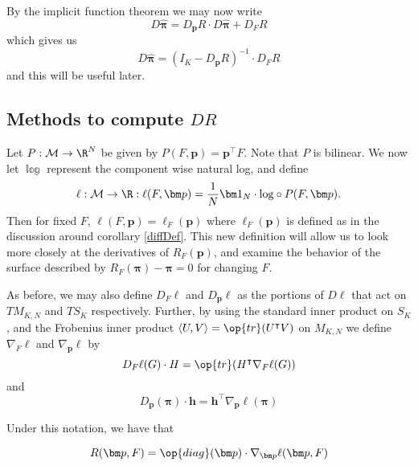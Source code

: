 By the implicit function theorem we may now write
\[D\hat{\bm\pi}=D_{\bm p}R\cdot D\hat{\bm\pi}+D_FR\]
which gives us
\begin{equation}\label{dPiDF}
D\hat{\bm\pi}=\left(I_K-D_{\bm p}R\right)^{-1}\cdot D_{F}R
\end{equation}
and this will be useful later.

\subsection{Methods to compute $DR$}

Let $P:\mathcal{M}\rightarrow \R^{N}$ be given by $P(F,\bm p)=\bm p^{\intercal}F$.  Note that $P$ is bilinear.  We now let $\mathbb{\log}$ represent the component wise natural log, and define 
\[\ell:\mathcal{M}\rightarrow \R:\ell(F,\bm p)=\frac{1}{N}\bm 1_N\cdot\mathbb{\log}\circ P(F,\bm p).\]
Then for fixed $F$, $\ell(F,\bm p)=\ell_F(\bm p)$ where $\ell_F(\bm p)$ is defined as in the discussion around corollary \ref{diffDef}.  This new definition will allow us to look more closely at the derivatives of $R_F(\bm p)$, and examine the behavior of the surface described by $R_F(\bm\pi)-\bm\pi=0$ for changing $F$.

As before, we may also define $D_F\ell$ and $D_{\bm p}\ell$ as the portions of $D\ell$ that act on $TM_{K,N}$ and $TS_K$ respectively.  Further, by using the standard inner product on $S_K$, and the Frobenius inner product $\langle U,V\rangle=\op{tr}(U^{\intercal}V)$ on $M_{K,N}$  we define $\nabla_F\ell$ and $\nabla_{\bm p}\ell$ by
\[D_F\ell(G)\cdot H=\op{tr}(H^{\intercal}\nabla_F\ell(G))\]
and
\begin{equation}\label{gradEll}
D_{\bm p}(\bm \pi)\cdot \bm h=\bm h^{\intercal}\nabla_{\bm p}\ell(\bm\pi)
\end{equation}

Under this notation, we have that 

\begin{equation}\label{rGradDef}
R(\bm p,F)=\op{diag}(\bm p)\cdot\nabla_{\bm p}\ell(\bm p,F)
\end{equation}


